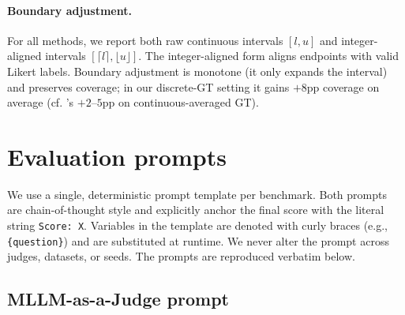 \documentclass{article}
\begin{document}
\paragraph{Boundary adjustment.}
For all methods, we report both raw continuous intervals $[l, u]$ and integer-aligned intervals $[\lceil l \rceil, \lfloor u \rfloor]$. The integer-aligned form aligns endpoints with valid Likert labels. Boundary adjustment is monotone (it only expands the interval) and preserves coverage; in our discrete-GT setting it gains $+8$pp coverage on average (cf. \citealp{sheng2025analyzing}'s $+2$--$5$pp on continuous-averaged GT).

\section{Evaluation prompts}
\label{app:prompts}

We use a single, deterministic prompt template per benchmark. Both prompts are chain-of-thought style and explicitly anchor the final score with the literal string \texttt{Score: X}. Variables in the template are denoted with curly braces (e.g., \texttt{\{question\}}) and are substituted at runtime. We never alter the prompt across judges, datasets, or seeds. The prompts are reproduced verbatim below.

\subsection{MLLM-as-a-Judge prompt}
\label{app:prompt_mllm}
\end{document}

